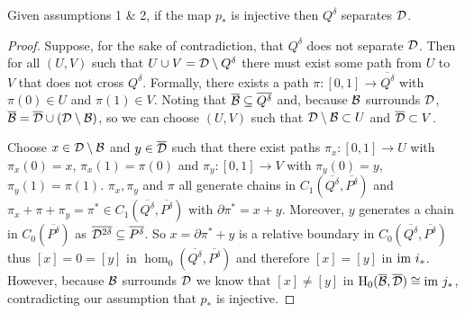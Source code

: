 \begin{lemma}\label{lem:separate}
    Given assumptions 1 \& 2, if the map $p_*$ is injective then $Q^\delta$ separates ${\mathcal{D}}$.
\end{lemma}
\begin{proof}
    Suppose, for the sake of contradiction, that $Q^\delta$ does not separate ${\mathcal{D}}$.
    Then for all $(U, V)$ such that $U \cup V = {\mathcal{D}}\setminus Q^\delta$ there must exist some path from $U$ to $V$ that does not cross $Q^\delta$.
    Formally, there exists a path $\pi : [0,1]\to\overline{Q^\delta}$ with $\pi(0)\in U$ and $\pi(1)\in V$.
    Noting that $\overline{{\mathcal{B}}}\subseteq \overline{Q^\delta}$ and, because ${\mathcal{B}}$ surrounds ${\mathcal{D}}$, $\overline{{\mathcal{B}}} = \overline{{\mathcal{D}}}\cup ({\mathcal{D}}\setminus{\mathcal{B}})$, so we can choose $(U, V)$ such that ${\mathcal{D}}\setminus {\mathcal{B}}\subset U$ and $\overline{{\mathcal{D}}}\subset V$.

    Choose $x\in{\mathcal{D}}\setminus {\mathcal{B}}$ and $y\in \overline{{\mathcal{D}}}$ such that there exist paths $\pi_x : [0,1]\to U$ with $\pi_x(0) = x$, $\pi_x(1) = \pi(0)$ and $\pi_y : [0,1]\to V$ with $\pi_y(0) = y$, $\pi_y(1) = \pi(1)$.
    $\pi_x, \pi_y$ and $\pi$ all generate chains in $C_1(\overline{Q^\delta}, \overline{P^\delta})$ and $\pi_x + \pi + \pi_y = \pi^*\in C_1(\overline{Q^\delta}, \overline{P^\delta})$ with $\partial\pi^* = x + y$.
    Moreover, $y$ generates a chain in $C_0(\overline{P^\delta})$ as $\overline{{\mathcal{D}}^{2\delta}}\subseteq\overline{P^\delta}$.
    So $x = \partial\pi^* + y$ is a relative boundary in $C_0(\overline{Q^\delta}, \overline{P^\delta})$ thus $[x] = 0 = [y]$ in $\hom_0(\overline{Q^\delta}, \overline{P^\delta})$ and therefore $[x] = [y]$ in $\mathrm{im}~i_*$.
    However, because ${\mathcal{B}}$ surrounds ${\mathcal{D}}$ we know that $[x]\neq [y]$ in $\mathrm{H}_0(\overline{{\mathcal{B}}}, \overline{{\mathcal{D}}})\cong \mathrm{im}~j_*$, contradicting our assumption that $p_*$ is injective.
\end{proof}
%

